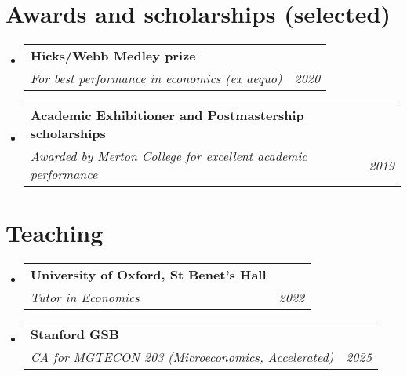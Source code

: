 \documentclass[letterpaper,11pt]{article}
\makeatletter
\newcommand{\resumeSubheading}[3]{
  \vspace{-2pt}\item
    \begin{tabular*}{0.97\textwidth}[t]{l@{\extracolsep{\fill}}r}
      \textbf{#1} \\
      \textit{\small#2} & \textit{\small #3} \\
    \end{tabular*}\vspace{-7pt}
}
\newcommand{\resumeSubSubheading}[2]{
    \item
    \begin{tabular*}{0.97\textwidth}{l@{\extracolsep{\fill}}r}
      \textit{\small#1} & \textit{\small #2} \\
    \end{tabular*}\vspace{-7pt}
}
\newcommand{\resumeSubHeadingListStart}{\begin{itemize}[leftmargin=0.15in, label={}]}
\newcommand{\resumeSubHeadingListEnd}{\end{itemize}}
\makeatother
\begin{document}
  \vspace{0.15cm}

\begin{comment}

  \section{Publications}
  \resumeSubHeadingListStart
  \resumeSubheading
      {Incentive separability}
      {With Pawe\l{} Doligalski, Piotr Dworczak, Joanna Krysta}{}
      \vspace*{-0.25cm}
      \resumeSubSubheading
      {Accepted at \textbf{Journal of Political Economy: Microeconomics}}{}
      
  \section{Working papers}
  \resumeSubHeadingListStart
    \resumeSubheading
    {Pricing priorities in waitlists}
    {Working paper}{}
    resumeSubheading
    {Equitable screening}
    {Working paper}{}
      \resumeSubheading
      {Ironing allocations}
      {Working paper}{}
      \resumeSubheading
        {A market-design response to the European energy crisis}
        {Policy paper with Mohammad Akbarpour, Piotr Dworczak, Scott Kominers}{}
    \resumeSubHeadingListEnd
  \end{comment} 

  \vspace{0.15cm}
  






\section{Awards and scholarships (selected)}
  \resumeSubHeadingListStart
     \resumeSubheading
      {Hicks/Webb Medley prize}
      {For best performance in economics (ex aequo)}{2020}
\newline
     \resumeSubheading
      {Academic Exhibitioner and Postmastership scholarships}
      {Awarded by Merton College for excellent academic performance}{2019}
  \resumeSubHeadingListEnd

  \vspace{0.15cm}




\section{Teaching}
  \resumeSubHeadingListStart
     \resumeSubheading
      {University of Oxford, St Benet’s Hall}
      {Tutor in Economics}{2022}
      \resumeSubheading
      {Stanford GSB}
      {CA for MGTECON 203 (Microeconomics, Accelerated)}{2025}
  \resumeSubHeadingListEnd
\end{document}
